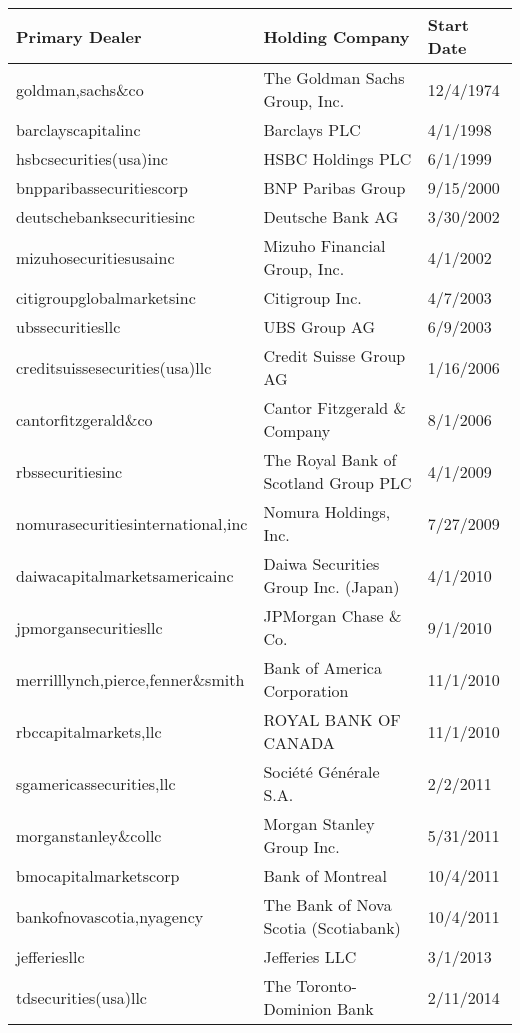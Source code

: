 \begin{tabular}{lll}
\toprule
Primary Dealer & Holding Company & Start Date \\
\midrule
goldman,sachs\&co & The Goldman Sachs Group, Inc. & 12/4/1974 \\
barclayscapitalinc & Barclays PLC & 4/1/1998 \\
hsbcsecurities(usa)inc & HSBC Holdings PLC & 6/1/1999 \\
bnpparibassecuritiescorp & BNP Paribas Group & 9/15/2000 \\
deutschebanksecuritiesinc & Deutsche Bank AG & 3/30/2002 \\
mizuhosecuritiesusainc & Mizuho Financial Group, Inc. & 4/1/2002 \\
citigroupglobalmarketsinc & Citigroup Inc. & 4/7/2003 \\
ubssecuritiesllc & UBS Group AG & 6/9/2003 \\
creditsuissesecurities(usa)llc & Credit Suisse Group AG & 1/16/2006 \\
cantorfitzgerald\&co & Cantor Fitzgerald \& Company & 8/1/2006 \\
rbssecuritiesinc & The Royal Bank of Scotland Group PLC & 4/1/2009 \\
nomurasecuritiesinternational,inc & Nomura Holdings, Inc. & 7/27/2009 \\
daiwacapitalmarketsamericainc & Daiwa Securities Group Inc. (Japan) & 4/1/2010 \\
jpmorgansecuritiesllc & JPMorgan Chase \& Co. & 9/1/2010 \\
merrilllynch,pierce,fenner\&smith & Bank of America Corporation & 11/1/2010 \\
rbccapitalmarkets,llc & ROYAL BANK OF CANADA & 11/1/2010 \\
sgamericassecurities,llc & Société Générale S.A. & 2/2/2011 \\
morganstanley\&collc & Morgan Stanley Group Inc. & 5/31/2011 \\
bmocapitalmarketscorp & Bank of Montreal & 10/4/2011 \\
bankofnovascotia,nyagency & The Bank of Nova Scotia (Scotiabank) & 10/4/2011 \\
jefferiesllc & Jefferies LLC & 3/1/2013 \\
tdsecurities(usa)llc & The Toronto-Dominion Bank & 2/11/2014 \\
\bottomrule
\end{tabular}

